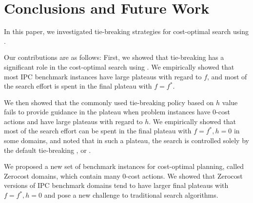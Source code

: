 
\section{Conclusions and Future Work}

In this paper, we investigated tie-breaking strategies for cost-optimal search using \astar.  
\begin{comment} %
We sought to (1) shed some light on the importance of tie-breaking in \astar,  %
(2) improve \astar without modifying its main heuristic function at all, and (3) to
improve \astar by introducing inadmissible techniques. We reached all of these goals successfully: We sought
various possible enhancements and achieved significant performance improvements solely by the tie-breaking
techniques. In detail, the contributions in this paper are the following:
\end{comment}
Our contributions are as follows:
 First, we showed that tie-breaking has a significant role in the cost-optimal
       search using \astar. We empirically showed that most  IPC
       benchmark instances have large plateaus with regard to $f$, and most of the
       search effort is spent in the final plateau with $f=f^*$.

 We then showed that  the commonly used tie-breaking policy based on $h$ value fails to
       provide guidance in the plateau when problem instances have 0-cost
       actions and have large plateaus with regard to $h$.
       We empirically showed that most of the search effort can be spent in
       the final plateau with $f=f^*, h=0$ in some domains, and noted that in such
       a plateau, the search is controlled solely by the
       default tie-breaking \fifo, \lifo or \ro.

 We proposed  a new set of benchmark instances for cost-optimal planning, called Zerocost
 domains, which contain many 0-cost actions.
         We showed that Zerocost versions of IPC benchmark domains tend to have larger final plateaus with $f=f^*, h=0$ and pose a new challenge to traditional search algorithms.

